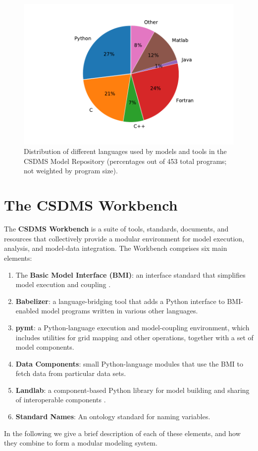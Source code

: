 \documentclass{article} %
\begin{document}
\begin{figure}[h!]
\centering
\includegraphics[scale=0.8]{Figures/languages_in_repository.pdf}
\caption{Distribution of different languages used by models and tools in the CSDMS Model Repository (percentages out of 453 total programs; not weighted by program size).}
\label{fig:languages}
\end{figure}


\section{The CSDMS Workbench}
\label{sec:workbench}

The \textbf{CSDMS Workbench} is a suite of tools, standards, documents, and resources that collectively provide a modular environment for model execution, analysis, and model-data integration. The Workbench comprises six main elements: 
\begin{enumerate}
    \item The \textbf{Basic Model Interface (BMI)}: an interface standard that simplifies model execution and coupling \citep{hutton2020basic,peckham2013component}.
    \item \textbf{Babelizer}: a language-bridging tool that adds a Python interface to BMI-enabled model programs written in various other languages.
    \item \textbf{pymt}: a Python-language execution and model-coupling environment, which includes utilities for grid mapping and other operations, together with a set of model components.
    \item \textbf{Data Components}: small Python-language modules that use the BMI to fetch data from particular data sets.
    \item \textbf{Landlab}: a component-based Python library for model building and sharing of interoperable components \citep{hobley2017creative,barnhart2020short}.
    \item \textbf{Standard Names}: An ontology standard for naming variables.
\end{enumerate}
In the following we give a brief description of each of these elements, and how they combine to form a modular modeling system.
\end{document}
